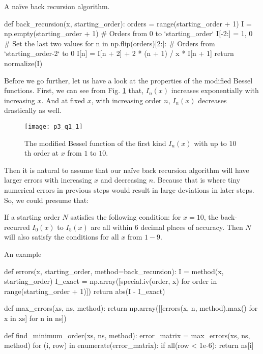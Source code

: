\begin{algorithm}
    \caption{A naïve back recursion algorithm.}
    \label{lst:back_recursion}
    \begin{pythoncode}
        def back_recursion(x, starting_order):
            orders = range(starting_order + 1)
            I = np.empty(starting_order + 1)  # Orders from 0 to `starting_order`
            I[-2:] = 1, 0  # Set the last two values
            for n in np.flip(orders)[2:]:  # Orders from `starting_order-2` to 0
                I[n] = I[n + 2] + 2 * (n + 1) / x * I[n + 1]
            return normalize(I)
    \end{pythoncode}
\end{algorithm}

Before we go further, let us have a look at the properties of the modified Bessel
functions. First, we can see from Fig. \ref{fig:bessel} that,
$I_n(x)$ increases exponentially with increasing $x$.
And at fixed $x$, with increasing order $n$, $I_n(x)$ decreases drastically as well.

\begin{figure}[H]
    \centering
    \texttt{[image: p3\_q1\_1]}
    \caption{The modified Bessel function of the first kind $I_n(x)$ with
        up to $10$th order at $x$ from $1$ to $10$.}
    \label{fig:bessel}
\end{figure}

Then it is natural to assume that our naïve back recursion algorithm will have larger
errors with increasing $x$ and decreasing $n$. Because that is where tiny numerical
errors in previous steps would result in large deviations in later steps.
So, we could presume that:
\begin{theorem}\label{thm:I_n_x}
    If a starting order $N$ satisfies the following condition:
    for $x = 10$, the back-recurred $I_0(x)$ to $I_5(x)$ are all within $6$ decimal
    places of accuracy. Then $N$ will also satisfy the conditions for all $x$ from $1 - 9$.
\end{theorem}

\begin{algorithm}
    \caption{An example}
    \label{lst:find_n}
    \begin{pythoncode}
        def errors(x, starting_order, method=back_recursion):
            I = method(x, starting_order)
            I_exact = np.array([special.iv(order, x) for order in range(starting_order + 1)])
            return abs(I - I_exact)
        
        
        def max_errors(xs, ns, method):
            return np.array([[errors(x, n, method).max() for x in xs] for n in ns])
        
        
        def find_minimum_order(xs, ns, method):
            error_matrix = max_errors(xs, ns, method)
            for (i, row) in enumerate(error_matrix):
                if all(row < 1e-6):
                    return ns[i]
        \end{pythoncode}
\end{algorithm}

